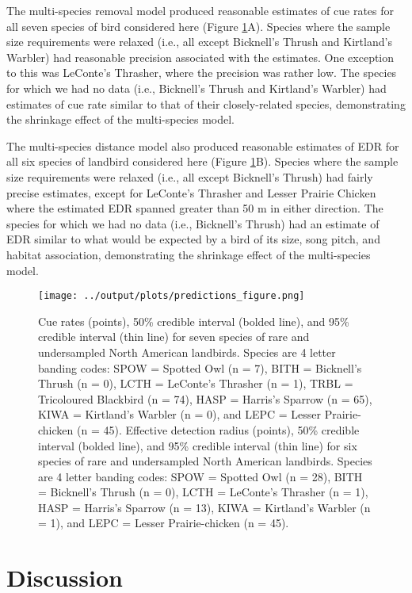 \documentclass[12pt]{article}
\begin{document}
\par The multi-species removal model produced reasonable estimates of cue rates for all seven species of bird considered here (Figure \ref{fig:predictions}A).
Species where the sample size requirements were relaxed (i.e., all except Bicknell's Thrush and Kirtland's Warbler) had reasonable precision associated with the estimates.
One exception to this was LeConte's Thrasher, where the precision was rather low.
The species for which we had no data (i.e., Bicknell's Thrush and Kirtland's Warbler) had estimates of cue rate similar to that of their closely-related species, demonstrating the shrinkage effect of the multi-species model.

\par The multi-species distance model also produced reasonable estimates of EDR for all six species of landbird considered here (Figure \ref{fig:predictions}B).
Species where the sample size requirements were relaxed (i.e., all except Bicknell's Thrush) had fairly precise estimates, except for LeConte's Thrasher and Lesser Prairie Chicken where the estimated EDR spanned greater than 50 m in either direction.
The species for which we had no data (i.e., Bicknell's Thrush) had an estimate of EDR similar to what would be expected by a bird of its size, song pitch, and habitat association, demonstrating the shrinkage effect of the multi-species model.

\begin{figure}[h!]
	\texttt{[image: ../output/plots/predictions\_figure.png]}
	\caption{Cue rates (points), 50\% credible interval (bolded line), and 95\% credible interval (thin line) for seven species of rare and undersampled North American landbirds. Species are 4 letter banding codes: SPOW = Spotted Owl (n = 7), BITH = Bicknell's Thrush (n = 0), LCTH = LeConte's Thrasher (n = 1), TRBL = Tricoloured Blackbird (n = 74), HASP = Harris's Sparrow (n = 65), KIWA = Kirtland's Warbler (n = 0), and LEPC = Lesser Prairie-chicken (n = 45). Effective detection radius (points), 50\% credible interval (bolded line), and 95\% credible interval (thin line) for six species of rare and undersampled North American landbirds. Species are 4 letter banding codes: SPOW = Spotted Owl (n = 28), BITH = Bicknell's Thrush (n = 0), LCTH = LeConte's Thrasher (n = 1), HASP = Harris's Sparrow (n = 13), KIWA = Kirtland's Warbler (n = 1), and LEPC = Lesser Prairie-chicken (n = 45).}
	\label{fig:predictions}
\end{figure}

\section{Discussion}
\end{document}
